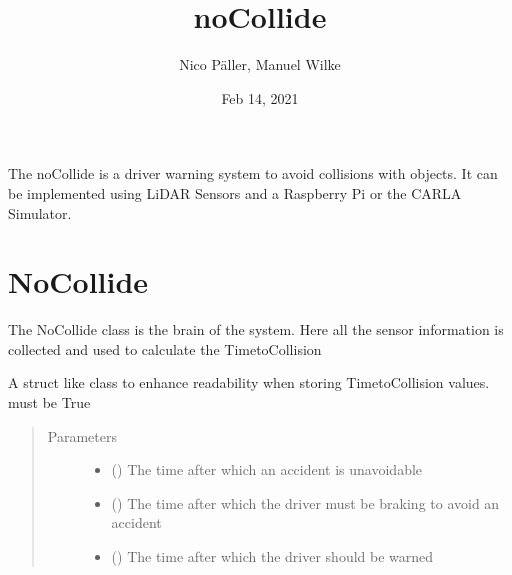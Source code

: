 \documentclass[letterpaper,10pt,english]{sphinxmanual}
\title{noCollide}
\date{Feb 14, 2021}
\author{Nico Päller, Manuel Wilke}
\begin{document}
\pagestyle{empty}
\sphinxmaketitle
\pagestyle{plain}
\sphinxtableofcontents
\pagestyle{normal}
\label{\detokenize{index::doc}}


The noCollide is a driver warning system to avoid collisions with objects. It can be implemented using LiDAR Sensors and
a Raspberry Pi or the CARLA Simulator.

\ignorespaces 

\chapter{NoCollide}
\label{\detokenize{no_collide:nocollide}}\label{\detokenize{no_collide:index-0}}\label{\detokenize{no_collide::doc}}
The NoCollide class is the brain of the system. Here all the sensor information is collected and used to calculate the
Time\sphinxhyphen{}to\sphinxhyphen{}Collision

\begin{fulllineitems}
\label{\detokenize{no_collide:lib.nocollide.TtcTimes}}
A struct like class to enhance readability when storing Time\sphinxhyphen{}to\sphinxhyphen{}Collision values.
 must be True
\begin{quote}\begin{description}
\item[{Parameters}] \leavevmode\begin{itemize}
\item {} 
 () \textendash{} The time after which an accident is unavoidable

\item {} 
 () \textendash{} The time after which the driver must be braking to avoid an accident

\item {} 
 () \textendash{} The time after which the driver should be warned

\end{itemize}

\end{description}\end{quote}

\end{fulllineitems}
\end{document}
